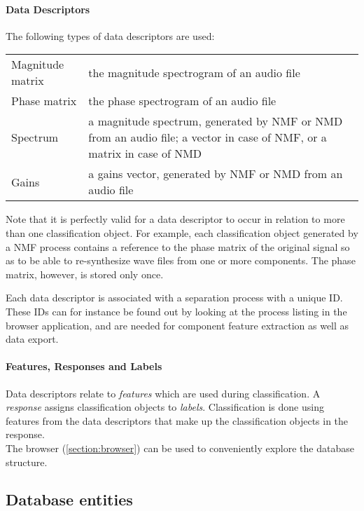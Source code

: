 \paragraph{Data Descriptors} The following types of data descriptors are used:
\begin{center}
  \begin{tabular}{|p{}|p{}|}
    \hline
    Magnitude matrix & the magnitude spectrogram of an audio file \\
    Phase matrix & the phase spectrogram of an audio file \\
    Spectrum & a magnitude spectrum, generated by NMF or NMD from an audio file; a vector in case of NMF, or a matrix in case of NMD \\
    Gains & a gains vector, generated by NMF or NMD from an audio file \\
    \hline
  \end{tabular}
\end{center}
Note that it is perfectly valid for a data descriptor to occur in relation to
more than one classification object. For example, each classification object
generated by a NMF process contains a reference to the phase matrix of the
original signal so as to be able to re-synthesize wave files from one or more
components. The phase matrix, however, is stored only once.

Each data descriptor is associated with a separation process with a unique ID.
These IDs can for instance be found out by looking at the process listing in
the browser application, and are needed for component feature extraction
as well as data export.

\paragraph{Features, Responses and Labels} Data descriptors relate to
\emph{features} which are used during classification. A \emph{response} assigns
classification objects to \emph{labels}. Classification is done using features
from the data descriptors that make up the classification objects in the
response.\\

\noindent The browser (\ref{section:browser}) can be used to conveniently
explore the database structure.

\subsection{Database entities}

